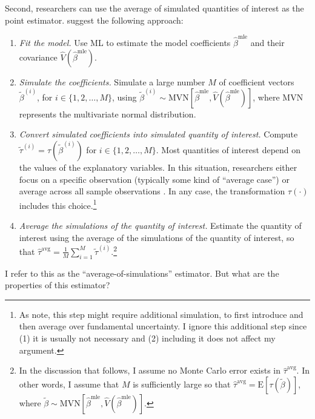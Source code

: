 \documentclass[12pt]{article}
\begin{document}
Second, researchers can use the average of simulated quantities of interest as the point estimator. 
\cite{KingTomzWittenberg2000} suggest the following approach:\vspace{.1in}
\begin{enumerate}
\item \textit{Fit the model.}
Use ML to estimate the model coefficients $\hat{\beta}^{\text{mle}}$ and their covariance $\hat{V} \left( \hat{\beta}^{\text{mle}} \right)$.
\item \textit{Simulate the coefficients.}
Simulate a large number $M$ of coefficient vectors $\tilde{\beta}^{(i)}$, for $i \in \{1, 2,\ldots, M\}$, using $\tilde{\beta}^{(i)} \sim \text{MVN} \left[ \hat{\beta}^{\text{mle}}, \hat{V} \left( \hat{\beta}^{\text{mle}} \right) \right]$, where MVN represents the multivariate normal distribution.
\item \textit{Convert simulated coefficients into simulated quantity of interest.}
Compute $\tilde{\tau}^{(i)} = \tau \left( \tilde{\beta}^{(i)} \right)$ for $i \in \{1, 2,\ldots, M\}$.
Most quantities of interest depend on the values of the explanatory variables. In this situation, researchers either focus on a specific observation (typically some kind of ``average case'') or average across all sample observations \citep{HanmerKalkan2013}. In any case, the transformation $\tau(\cdot)$ includes this choice.\footnote{As \cite{KingTomzWittenberg2000} note, this step might require additional simulation, to first introduce and then average over fundamental uncertainty. I ignore this additional step since (1) it is usually not necessary and (2) including it does not affect my argument.} \item \textit{Average the simulations of the quantity of interest.} Estimate the quantity of interest using the average of the simulations of the quantity of interest, so that $\hat{\tau}^{\text{avg}} = \frac{1}{M} \sum_{i = 1}^{M} \tilde{\tau}^{(i)}$.\footnote{In the discussion that follows, I assume no Monte Carlo error exists in $\hat{\tau}^{\text{avg}}$. In other words, I assume that $M$ is sufficiently large so that $\hat{\tau}^{\text{avg}} = \text{E}\left[ \tau \left(\tilde{\beta} \right) \right]$, where $\tilde{\beta} \sim \text{MVN} \left[ \hat{\beta}^{\text{mle}}, \hat{V} \left( \hat{\beta}^{\text{mle}} \right) \right]$.}\\
\end{enumerate}
\noindent I refer to this as the ``average-of-simulations'' estimator. But what are the properties of this estimator?
\end{document}

